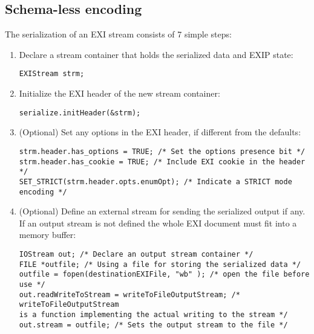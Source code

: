 \subsection{Schema-less encoding}
The serialization of an EXI stream consists of 7 simple steps:
\begin{enumerate}
 \item Declare a stream container that holds the serialized data and EXIP state:
\begin{lstlisting}
EXIStream strm;
\end{lstlisting}

 \item Initialize the EXI header of the new stream container:
\begin{lstlisting}
serialize.initHeader(&strm);                                                            
\end{lstlisting}


 \item \label{item:step-options} (Optional) Set any options in the EXI header, if different from the defaults:
\begin{lstlisting}
strm.header.has_options = TRUE; /* Set the options presence bit */ 
strm.header.has_cookie = TRUE; /* Include EXI cookie in the header */
SET_STRICT(strm.header.opts.enumOpt); /* Indicate a STRICT mode encoding */
\end{lstlisting}

 \item (Optional) Define an external stream for sending the serialized output if any. If an output stream
is not defined the whole EXI document must fit into a memory buffer:
\begin{lstlisting}
IOStream out; /* Declare an output stream container */
FILE *outfile; /* Using a file for storing the serialized data */
outfile = fopen(destinationEXIFile, "wb" ); /* open the file before use */
out.readWriteToStream = writeToFileOutputStream; /* writeToFileOutputStream
is a function implementing the actual writing to the stream */
out.stream = outfile; /* Sets the output stream to the file */
\end{lstlisting}


\end{enumerate}
